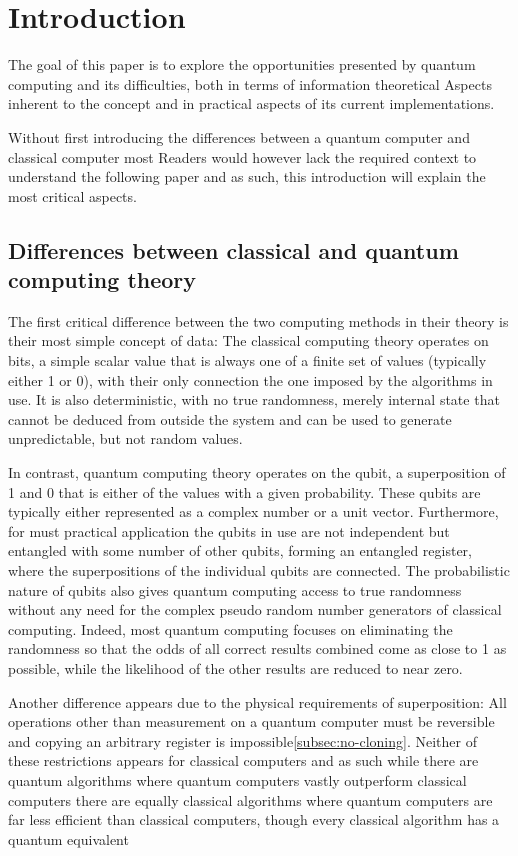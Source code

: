 \section{Introduction} \label{sec:introduction}
The goal of this paper is to explore the opportunities presented by quantum computing and its difficulties,
both in terms of information theoretical Aspects inherent to the concept and in practical aspects of its current
implementations.

Without first introducing the differences between a quantum computer and classical computer most Readers would however
lack the required context to understand the following paper and as such, this introduction will explain the most
critical aspects.

\subsection{Differences between classical and quantum computing theory} \label{subsec:diffclassquanttheory}
The first critical difference between the two computing methods in their theory is their most simple concept of data:
The classical computing theory operates on bits, a simple scalar value that is always one of a finite set of values
(typically either 1 or 0), with their only connection the one imposed by the algorithms in use.
It is also deterministic, with no true randomness, merely internal state that cannot be deduced from outside the system
and can be used to generate unpredictable, but not random values.

In contrast, quantum computing theory operates on the qubit, a superposition of 1 and 0 that is either of the values
with a given probability.
These qubits are typically either represented as a complex number or a unit vector.
Furthermore, for must practical application the qubits in use are not independent but entangled with some number of
other qubits, forming an entangled register, where the superpositions of the individual qubits are connected.
The probabilistic nature of qubits also gives quantum computing access to true randomness without any need for the
complex pseudo random number generators of classical computing.
Indeed, most quantum computing focuses on eliminating the randomness so that the odds of all correct results combined
come as close to 1 as possible, while the likelihood of the other results are reduced to near zero.

Another difference appears due to the physical requirements of superposition: All operations other than measurement on
a quantum computer must be reversible and copying an arbitrary register is impossible\ref{subsec:no-cloning}.
Neither of these restrictions appears for classical computers and as such while there are quantum algorithms where
quantum computers vastly outperform classical computers there are equally classical algorithms where quantum computers
are far less efficient than classical computers, though every classical algorithm has a quantum equivalent %

